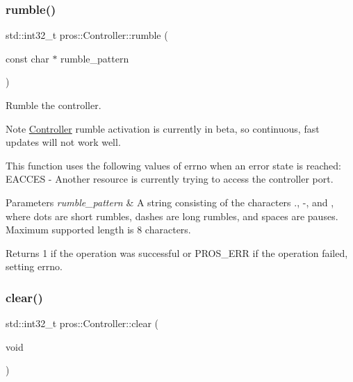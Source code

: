 \subsubsection{\texorpdfstring{rumble()}{rumble()}}
{\footnotesize\ttfamily std\+::int32\+\_\+t pros\+::\+Controller\+::rumble (\begin{DoxyParamCaption}\item[{const char $\ast$}]{rumble\+\_\+pattern }\end{DoxyParamCaption})}



Rumble the controller. 

\begin{DoxyNote}{Note}
\hyperlink{classpros_1_1Controller}{Controller} rumble activation is currently in beta, so continuous, fast updates will not work well.
\end{DoxyNote}
This function uses the following values of errno when an error state is reached\+: E\+A\+C\+C\+ES -\/ Another resource is currently trying to access the controller port.


\begin{DoxyParams}{Parameters}
{\em rumble\+\_\+pattern} & A string consisting of the characters \textquotesingle{}.\textquotesingle{}, \textquotesingle{}-\/\textquotesingle{}, and \textquotesingle{} \textquotesingle{}, where dots are short rumbles, dashes are long rumbles, and spaces are pauses. Maximum supported length is 8 characters.\\
\hline
\end{DoxyParams}
\begin{DoxyReturn}{Returns}
1 if the operation was successful or P\+R\+O\+S\+\_\+\+E\+RR if the operation failed, setting errno. 
\end{DoxyReturn}
\mbox{\label{classpros_1_1Controller_a49a332fe032c3aaf94e24bb3a51945e1}} 
\subsubsection{\texorpdfstring{clear()}{clear()}}
{\footnotesize\ttfamily std\+::int32\+\_\+t pros\+::\+Controller\+::clear (\begin{DoxyParamCaption}\item[{void}]{ }\end{DoxyParamCaption})}



